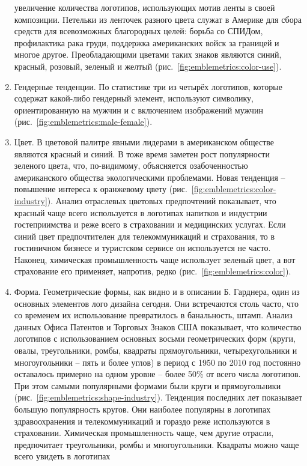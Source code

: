 \begin{enumerate}
  увеличение количества логотипов, использующих мотив ленты в своей композиции. Петельки из ленточек
  разного цвета служат в Америке для сбора средств для всевозможных благородных целей: борьба со
  СПИДом, профилактика рака груди, поддержка американских войск за границей и многое
  другое. Преобладающими цветами таких знаков являются синий, красный, розовый, зеленый и желтый
  (рис.~\ref{fig:emblemetrics:color-use}).
\item Гендерные тенденции. По статистике три из четырёх логотипов, которые содержат какой-либо
  гендерный элемент, используют символику, ориентированную на мужчин и с включением изображений
  мужчин (рис.~\ref{fig:emblemetrics:male-female}).
\item Цвет. В цветовой палитре явными лидерами в американском обществе являются красный и синий. В
  тоже время заметен рост популярности зеленого цвета, что, по-видимому, объясняется  озабоченностью
  американского общества экологическими проблемами. Новая тенденция -- повышение интереса к
  оранжевому цвету (рис.~\ref{fig:emblemetrics:color-industry}). Анализ отраслевых цветовых
  предпочтений показывает, что красный чаще всего используется в логотипах напитков и индустрии
  гостеприимства и реже всего в страховании и медицинских услугах. Если  синий цвет предпочтителен
  для  телекоммуникаций и страхования, то в гостиничном бизнесе и туристском сервисе он используется
  не часто. Наконец, химическая промышленность чаще использует зеленый цвет, а вот страхование его
  применяет, напротив, редко (рис.~\ref{fig:emblemetrics:color}).
\item Форма. Геометрические формы, как видно и в описании Б. Гарднера, один из основных элементов
  лого дизайна сегодня. Они встречаются столь часто, что со временем их использование превратилось в
  банальность, штамп. Анализ данных Офиса Патентов и Торговых Знаков США показывает, что  количество
  логотипов с использованием основных восьми геометрических форм (круги, овалы, треугольники, ромбы,
  квадраты прямоугольники, четырехугольники и многоугольники -- пять и более  углов)  в период с
  1950 по 2010 год постоянно оставалось примерно на одном уровне -- более 50\% от всего числа
  логотипов. При этом самыми популярными формами были круги и прямоугольники
  (рис.~\ref{fig:emblemetrics:shape-industry}). Тенденция последних лет показывает большую
  популярность кругов. Они наиболее популярны в логотипах здравоохранения и телекоммуникаций и
  гораздо реже используются в страховании. Химическая промышленность чаще, чем другие отрасли,
  предпочитает треугольники, ромбы и многоугольники. Квадраты можно чаще всего увидеть в логотипах

\end{enumerate}
